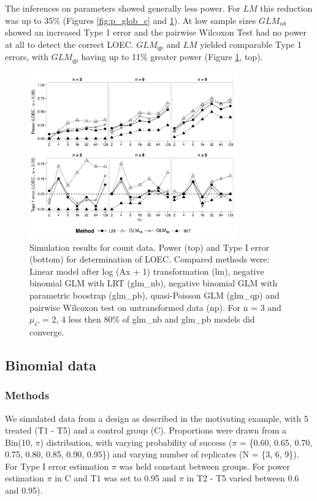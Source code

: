 \documentclass{scrartcl}
\begin{document}
The inferences on parameters showed generally less power.
For $LM$ this reduction was up to 35\% (Figures \ref{fig:p_glob_c} and \ref{fig:p_loec_c}).
At low sample sizes $GLM_{nb}$ showed an increased Type 1 error and the pairwise Wilcoxon Test had no power at all to detect the correct LOEC.
$GLM_{qp}$ and $LM$ yielded comparable Type 1 errors, with $GLM_{qp}$ having up to 11\% greater power (Figure \ref{fig:p_loec_c}, top).

\begin{figure}[h]
  \centering
  \includegraphics[width = 0.8\textwidth]{p_loec_c.pdf}
  \caption{Simulation results for count data. Power (top) and Type I error (bottom) for determination of LOEC. Compared methods were: Linear model after log (Ax + 1) transformation (lm), negative binomial GLM with LRT (glm\_nb), negative binomial GLM with parametric boostrap (glm\_pb), quasi-Poisson GLM (glm\_qp) and pairwise Wilcoxon test on untransformed data (np). For n = 3 and $\mu_C$ = {2, 4} less then 80\% of glm\_nb and glm\_pb models did converge.}
  \label{fig:p_loec_c}
\end{figure}



\subsection{Binomial data}
\subsubsection{Methods}
We simulated data from a design as described in the motivating example, with 5 treated (T1 - T5) and a control group (C). 
Proportions were drawn from a Bin(10, $\pi$) distribution, with varying probability of success ($\pi$ = \{0.60, 0.65, 0.70, 0.75, 0.80, 0.85, 0.90, 0.95\}) and varying number of replicates (N = \{3, 6, 9\}).
For Type I error estimation $\pi$ was held constant between groups.
For power estimation $\pi$ in C and T1 was set to 0.95 and $\pi$ in T2 - T5 varied between 0.6 and 0.95). 
 
\end{document}
